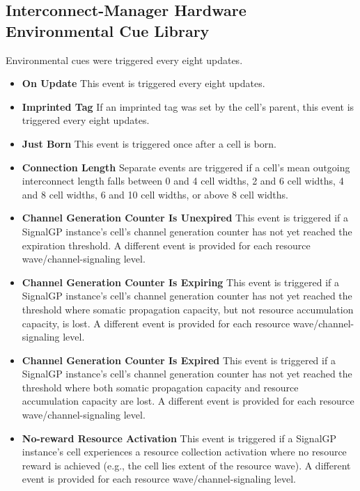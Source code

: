 \subsection{Interconnect-Manager Hardware Environmental Cue Library}

Environmental cues were triggered every eight updates.

\begin{itemize}
\item \textbf{On Update}
This event is triggered every eight updates.
\item \textbf{Imprinted Tag}
If an imprinted tag was set by the cell's parent, this event is triggered every eight updates.
\item \textbf{Just Born}
This event is triggered once after a cell is born.
\item \textbf{Connection Length}
Separate events are triggered if a cell's mean outgoing interconnect length falls between 0 and 4 cell widths, 2 and 6 cell widths, 4 and 8 cell widths, 6 and 10 cell widths, or above 8 cell widths.
\item \textbf{Channel Generation Counter Is Unexpired}
This event is triggered if a SignalGP instance's cell's channel generation counter has not yet reached the expiration threshold.
A different event is provided for each resource wave/channel-signaling level.
\item \textbf{Channel Generation Counter Is Expiring}
This event is triggered if a SignalGP instance's cell's channel generation counter has not yet reached the threshold where somatic propagation capacity, but not resource accumulation capacity, is lost.
A different event is provided for each resource wave/channel-signaling level.
\item \textbf{Channel Generation Counter Is Expired}
This event is triggered if a SignalGP instance's cell's channel generation counter has not yet reached the threshold where both somatic propagation capacity and resource accumulation capacity are lost.
A different event is provided for each resource wave/channel-signaling level.
\item \textbf{No-reward Resource Activation}
This event is triggered if a SignalGP instance's cell experiences a resource collection activation where no resource reward is achieved (e.g., the cell lies extent of the resource wave).
A different event is provided for each resource wave/channel-signaling level.
\end{itemize}

